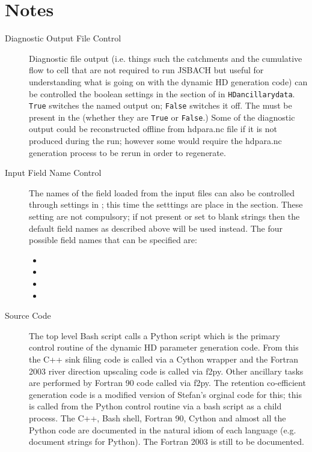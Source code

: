 \documentclass{article}
\begin{document}
\section{Notes} \label{section-notes}
\begin{description}
\item[Diagnostic Output File Control] Diagnostic file output (i.e. things such the catchments and the cumulative flow to cell that are not required to run JSBACH but useful for understanding what is going on with the dynamic HD generation code)  can be controlled the boolean settings in the  section of  in \texttt{HDancillarydata}. \texttt{True} switches the named output on; \texttt{False} switches it off. The   must be present in the  (whether they are \texttt{True} or \texttt{False}.) Some of the diagnostic output could be reconstructed offline from hdpara.nc file if it is not produced during the run; however some would require the hdpara.nc generation process to be rerun in order to regenerate.
\item[Input Field Name Control] The names of the field loaded from the input files can also be controlled through settings in ; this time the setttings are place in the  section. These setting are not compulsory; if not present or set to blank strings then the default field names as described above will be used instead. The four possible field names that can be specified are: 
\begin{itemize}
\item {}
\item {}
\item {}
\item {}
\end{itemize}
\item[Source Code] The top level Bash script calls a Python script which is the primary control routine of the dynamic HD parameter generation code. From this the C++ sink filing code is called via a Cython wrapper and the Fortran 2003 river direction upscaling code is called via f2py. Other ancillary tasks are performed by Fortran 90 code called via f2py. The retention co-efficient generation code is a modified version of Stefan's orginal code for this; this is called from the Python control routine via a bash script as a child process. The C++, Bash shell, Fortran 90, Cython and almost all the Python code are documented in the natural idiom of each language (e.g. document strings for Python). The Fortran 2003 is still to be documented.

\end{description}
\end{document}
